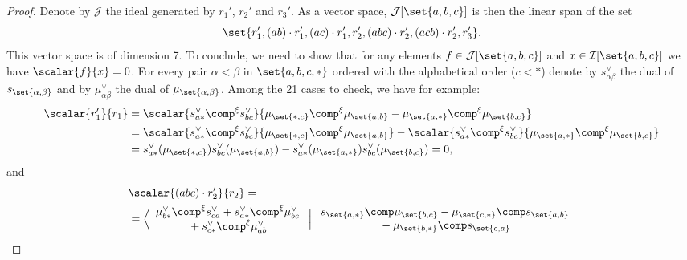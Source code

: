 \begin{proof}
    Denote by $\mathcal{J}$ the ideal generated by $r_1'$, $r_2'$ and $r_3'$. As a vector space, 
    $\mathcal{J}[\set{a,b,c}]$ is then the linear span of the set
    \begin{equation}
        \set{ r_1', (ab) \cdot r_1', (ac) \cdot r_1',r_2', (abc)\cdot r_2', (acb)\cdot r_2', r_3'}.
    \end{equation}
    This vector space is of dimension 7. To conclude, we need to show that for any elements 
    $f\in\mathcal{J}[\set{a,b,c}]$ and $x\in\mathcal{I}[\set{a,b,c}]$ we have $\scalar{f}{x}=0$. For every 
    pair $\alpha < \beta$ in $\set{a,b,c,\ast}$ ordered with the alphabetical order ($c<\ast$) denote 
    by $s_{\alpha\beta}^{\vee}$ the dual of $s_{\set{\alpha,\beta}}$ and by $\mu_{\alpha\beta}^{\vee}$ the 
    dual of $\mu_{\set{\alpha,\beta}}$. Among the 21 cases to check, we have for example:
    \begin{equation}\begin{split}
        \scalar{ r_1'}{r_1 } &=
        \scalar{ s_{a\ast}^{\vee}\comp^{\xi} s_{bc}^{\vee}}{\mu_{\set{\ast,c}}\comp^{\xi}\mu_{\set{a,b}} -
        \mu_{\set{a,\ast}}\comp^{\xi} \mu_{\set{b,c}} } \\
        &= \scalar{ s_{a\ast}^{\vee}\comp^{\xi} s_{bc}^{\vee}}{ \mu_{\set{\ast,c}}\comp^{\xi}\mu_{\set{a,b}} } - \scalar{ s_{a\ast}^{\vee}\comp^{\xi} s_{bc}^{\vee}}{\mu_{\set{a,\ast}}\comp^{\xi} \mu_{\set{b,c}}} \\
        &= s_{a\ast}^{\vee}(\mu_{\set{\ast,c}})s_{bc}^{\vee}(\mu_{\set{a,b}}) -
        s_{a\ast}^{\vee}(\mu_{\set{a,\ast}})s_{bc}^{\vee}(\mu_{\set{b,c}}) = 0,
    \end{split}\end{equation}
    and
    \begin{align}
        &\scalar{ (abc)\cdot r_2'}{r_2}  = \\ \nonumber
        &= \Big\langle
        \begin{array}{c}%
            \mu_{b\ast}^{\vee}\comp^{\xi}s_{ca}^{\vee} + s_{a\ast}^{\vee}\comp^{\xi}\mu_{bc}^{\vee} \\
            {}+{} s_{c\ast}^{\vee}\comp^{\xi}\mu_{ab}^{\vee}
        \end{array}
        \Bigm|
        \begin{array}{c}%
            s_{\set{a,\ast}}{\comp} \mu_{\set{b,c}} - \mu_{\set{c,\ast}}{\comp} s_{\set{a,b}} \\
            {}-{} \mu_{\set{b,\ast}}{\comp} s_{\set{c,a}}
        \end{array}%

\end{align}
\end{proof}
